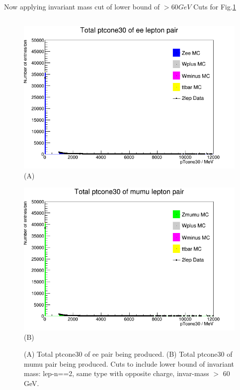 Now applying invariant mass cut of lower bound of $>60 GeV$
Cuts for Fig.\ref{fig:Zee-stack_total-ptcone30_(inv-mass-lower=60GeV,2lep=ee)_25_02_21_10}
\begin{lstlisting}

\end{lstlisting}
\begin{figure}[h!]
    \centering
    \begin{minipage}{0.5\textwidth}
        \centering
        \includegraphics[width=\linewidth]{plots/25-02-2021/Zee-stack_total-ptcone30_(inv-mass-lower=60GeV,2lep=ee)_25_02_21_10-38).png}
        (A)
    \end{minipage}\hfill
    \begin{minipage}{0.5\textwidth}
        \centering
        \includegraphics[width=\linewidth]{plots/25-02-2021/Zmumu-stack_total-ptcone30_(inv-mass-lower=60GeV,2lep=mumu)_25_02_21_10-30).png}
        (B)
    \end{minipage}
    \caption{(A) Total ptcone30 of ee pair being produced. (B) Total ptcone30 of mumu pair being produced. Cuts to include lower bound of invariant mass: lep-n==2, same type with opposite charge, invar-mass $>$ 60 GeV.}
    \label{fig:Zee-stack_total-ptcone30_(inv-mass-lower=60GeV,2lep=ee)_25_02_21_10}
\end{figure}




